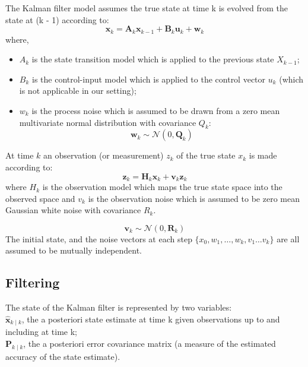\documentclass{article}
\begin{document}
The Kalman filter model assumes the true state at time k is evolved from the state at (k - 1) according to: \\
\[{\displaystyle \mathbf {x} _{k}=\mathbf {A} _{k}\mathbf {x} _{k-1}+\mathbf {B} _{k}\mathbf {u} _{k}+\mathbf {w} _{k}} 
\] where,

\begin{itemize}
    \item $A_k$ is the state transition model which is applied to the previous state $X _{k-1}$;
    \item $B_k$ is the control-input model which is applied to the control vector $u_k$ (which is not applicable in our setting);
    \item $w_k$ is the process noise which is assumed to be drawn from a zero mean multivariate normal distribution with covariance $Q_k$: \\
    \[
    {\displaystyle \mathbf {w} _{k}\sim {\mathcal {N}}(0,\mathbf {Q} _{k})} 
    \]
\end{itemize}

At time $k$ an observation (or measurement) $z_k$ of the true state $x_k$ is made according to: \\

\[
{\displaystyle \mathbf {z} _{k}=\mathbf {H} _{k}\mathbf {x} _{k}+\mathbf {v} _{k}} \mathbf {z} _{k}
\]
where $H_k$ is the observation model which maps the true state space into the observed space and $v_k$ is the observation noise which is assumed to be zero mean Gaussian white noise with covariance $R_k$.

\[
{\displaystyle \mathbf {v} _{k}\sim {\mathcal {N}}(0,\mathbf {R} _{k})} 
\]
The initial state, and the noise vectors at each step $\{x_0, w_1, …, w_k, v_1 … v_k\}$ are all assumed to be mutually independent.

\subsection{Filtering}
The state of the Kalman filter is represented by two variables: \\

${\displaystyle {\hat {\mathbf {x} }}_{k\mid k}}$, the a posteriori state estimate at time k given observations up to and including at time k; \\

${\displaystyle \mathbf {P} _{k\mid k}}$, the a posteriori error covariance matrix (a measure of the estimated accuracy of the state estimate).
\end{document}
